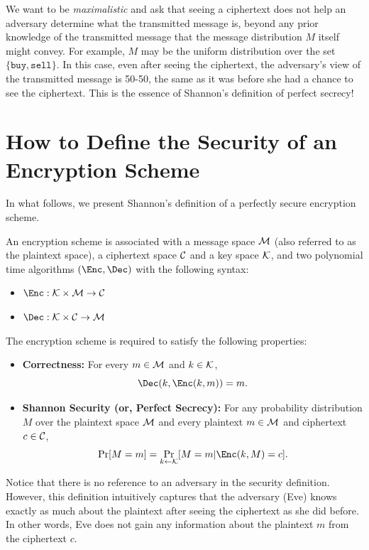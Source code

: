 We want to be {\em maximalistic} and ask that seeing a ciphertext does not help an adversary determine what the transmitted message is, beyond any prior knowledge of the transmitted message that the message distribution $M$ itself might convey. For example, $M$ may be the uniform distribution over the set $\{\texttt{buy},\texttt{sell}\}$. In this case, even after seeing the ciphertext, the adversary's view of the transmitted message is 50-50, the same as it was before she had a chance to see the ciphertext. This is the essence of Shannon's definition of perfect secrecy! 

\section{How to Define the Security of an Encryption Scheme} 

In what follows, we present Shannon's definition of a perfectly secure encryption scheme.
\begin{definition}
    An encryption scheme is associated with a message space ${\cal M}$ (also referred to as the plaintext space), a ciphertext space ${\cal C}$ and a key space ${\cal K}$, and two polynomial time algorithms $(\Enc, \Dec)$ with the following syntax:
    \begin{itemize}
        \item $\Enc:{\cal K}\times{\cal M}\rightarrow {\cal C}$
        \item $\Dec:{\cal K}\times{\cal C}\rightarrow {\cal M}$
    \end{itemize}
    The encryption scheme is required to satisfy the following properties:
    \begin{itemize}
        \item {\bf Correctness:}  For every $m\in{\cal M}$ and $k\in {\cal K}$,
        \[
        \Dec(k,\Enc(k,m))=m.
        \]
        \item {\bf Shannon Security (or, Perfect Secrecy):}
     For any probability distribution $M$ over the plaintext space ${\cal M}$ and every plaintext $m\in{\cal M}$ and ciphertext $c\in{\cal C}$,
    \[
    \Pr [M =m]= \Pr_{k\gets {\cal K}} [M = m | \Enc(k,M) = c] .
    \]
    \end{itemize}
\end{definition}
Notice that there is no reference to an adversary in the security definition.  However, this definition intuitively captures that the adversary (Eve) knows exactly as much about the plaintext after seeing the ciphertext as she did before. In other words, Eve does not gain any information about the plaintext $m$ from the ciphertext $c$.

